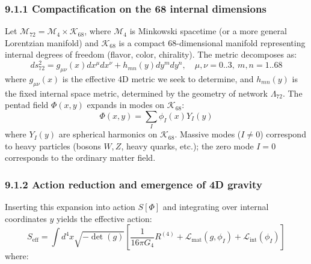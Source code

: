 \documentclass[11pt]{article}
\let\oldmathcal\mathcal
\renewcommand{\mathcal}[1]{\oldmathcal{#1}}
\begin{document}
\hypertarget{compactification-on-the-68-internal-dimensions}{%
\subsubsection{9.1.1 Compactification on the 68 internal
dimensions}\label{compactification-on-the-68-internal-dimensions}}

Let \(\mathcal{M}_{72} = \mathcal{M}_4 \times \mathcal{K}_{68}\), where
\(\mathcal{M}_4\) is Minkowski spacetime (or a more general Lorentzian
manifold) and \(\mathcal{K}_{68}\) is a compact 68-dimensional manifold
representing internal degrees of freedom (flavor, color, chirality). The
metric decomposes as: \[
ds^2_{72} = g_{\mu\nu}(x) dx^\mu dx^\nu + h_{mn}(y) dy^m dy^n, \quad \mu,\nu=0..3,\ m,n=1..68
\] where \(g_{\mu\nu}(x)\) is the effective 4D metric we seek to
determine, and \(h_{mn}(y)\) is the fixed internal space metric,
determined by the geometry of network \(\Lambda_{72}\). The pentad field
\(\Phi(x,y)\) expands in modes on \(\mathcal{K}_{68}\): \[
\Phi(x,y) = \sum_{I} \phi_I(x) Y_I(y)
\] where \(Y_I(y)\) are spherical harmonics on \(\mathcal{K}_{68}\).
Massive modes (\(I \neq 0\)) correspond to heavy particles (bosons
\(W,Z\), heavy quarks, etc.); the zero mode \(I=0\) corresponds to the
ordinary matter field.

\hypertarget{action-reduction-and-emergence-of-4d-gravity}{%
\subsubsection{9.1.2 Action reduction and emergence of 4D
gravity}\label{action-reduction-and-emergence-of-4d-gravity}}

Inserting this expansion into action \(S[\Phi]\) and integrating over
internal coordinates \(y\) yields the effective action: \[
S_{\text{eff}} = \int d^4x \sqrt{-\det(g)} \left[ \frac{1}{16\pi G_4} R^{(4)} + \mathcal{L}_{\text{mat}}(g,\phi_I) + \mathcal{L}_{\text{int}}(\phi_I) \right]
\] where:
\end{document}
